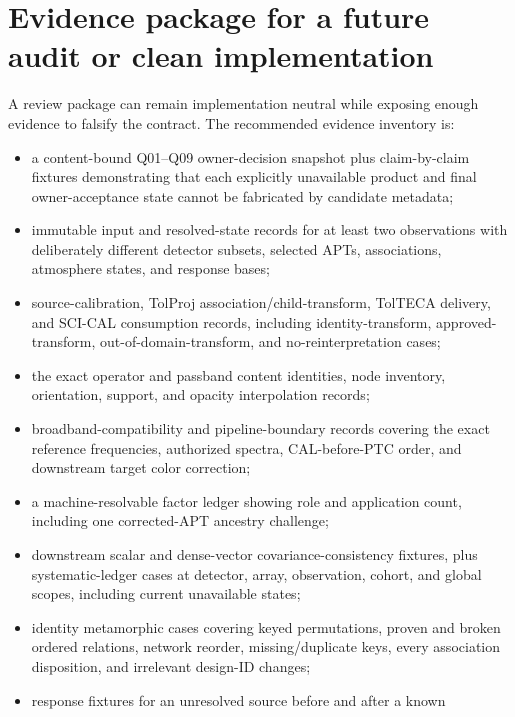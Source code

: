 \documentclass[10pt]{article}
\begin{document}







\section{Evidence package for a future audit or clean implementation}
\label{sec:eng-evidence}

A review package can remain implementation neutral while exposing enough
evidence to falsify the contract. The recommended evidence inventory is:

\begin{itemize}
\item a content-bound Q01--Q09 owner-decision snapshot plus claim-by-claim
  fixtures demonstrating that each explicitly unavailable product and final
  owner-acceptance state cannot be fabricated by candidate metadata;
\item immutable input and resolved-state records for at least two observations
  with deliberately different detector subsets, selected APTs, associations,
  atmosphere states, and response bases;
\item source-calibration, TolProj association/child-transform, TolTECA
  delivery, and SCI-CAL consumption records, including identity-transform,
  approved-transform, out-of-domain-transform, and no-reinterpretation cases;
\item the exact operator and passband content identities, node inventory,
  orientation, support, and opacity interpolation records;
\item broadband-compatibility and pipeline-boundary records covering the exact
  reference frequencies, authorized spectra, CAL-before-PTC order, and
  downstream target color correction;
\item a machine-resolvable factor ledger showing role and application count,
  including one corrected-APT ancestry challenge;
\item downstream scalar and dense-vector covariance-consistency fixtures, plus
  systematic-ledger cases at detector, array, observation, cohort, and global
  scopes, including current unavailable states;
\item identity metamorphic cases covering keyed permutations, proven and
  broken ordered relations, network reorder, missing/duplicate keys, every
  association disposition, and irrelevant design-ID changes;
\item response fixtures for an unresolved source before and after a known

\end{itemize}
\end{document}
